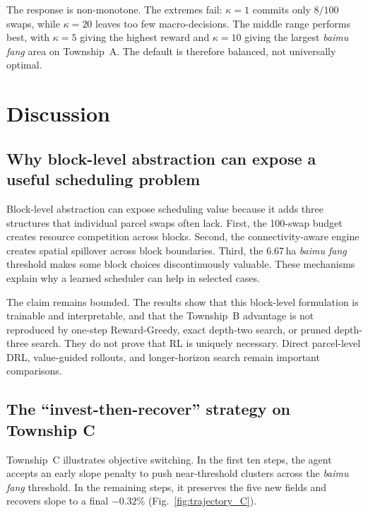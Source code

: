 \documentclass[preprint,12pt]{elsarticle}
\begin{document}
The response is non-monotone. The extremes fail: $\kappa=1$ commits only $8/100$ swaps, while $\kappa=20$ leaves too few macro-decisions. The middle range performs best, with $\kappa=5$ giving the highest reward and $\kappa=10$ giving the largest \textit{baimu fang} area on Township~A. The default is therefore balanced, not universally optimal.


\section{Discussion}
\label{sec:discussion}

\subsection{Why block-level abstraction can expose a useful scheduling problem}

Block-level abstraction can expose scheduling value because it adds three structures that individual parcel swaps often lack. First, the 100-swap budget creates resource competition across blocks. Second, the connectivity-aware engine creates spatial spillover across block boundaries. Third, the 6.67\,ha \textit{baimu fang} threshold makes some block choices discontinuously valuable. These mechanisms explain why a learned scheduler can help in selected cases.

The claim remains bounded. The results show that this block-level formulation is trainable and interpretable, and that the Township~B advantage is not reproduced by one-step Reward-Greedy, exact depth-two search, or pruned depth-three search. They do not prove that RL is uniquely necessary. Direct parcel-level DRL, value-guided rollouts, and longer-horizon search remain important comparisons.

\subsection{The ``invest-then-recover'' strategy on Township C}

Township~C illustrates objective switching. In the first ten steps, the agent accepts an early slope penalty to push near-threshold clusters across the \textit{baimu fang} threshold. In the remaining steps, it preserves the five new fields and recovers slope to a final $-0.32\%$ (Fig.~\ref{fig:trajectory_C}).
\end{document}
